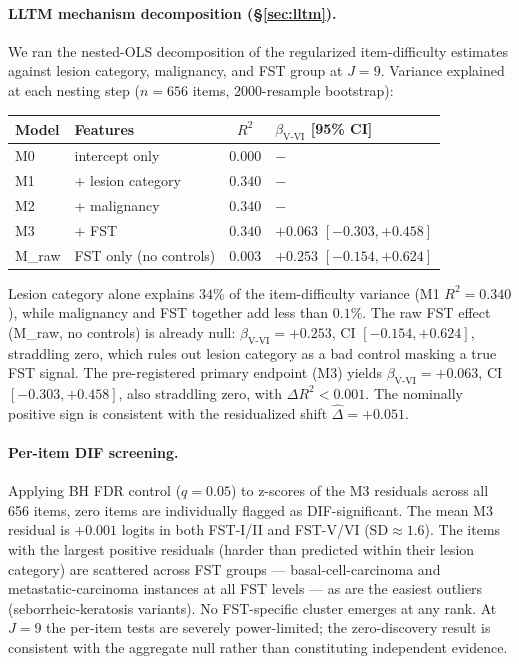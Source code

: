 \documentclass{article}
\begin{document}
\paragraph{LLTM mechanism decomposition (\S\ref{sec:lltm}).}
\label{sec:prelim_lltm}
We ran the nested-OLS decomposition of the regularized item-difficulty estimates against lesion category, malignancy, and FST group at $J = 9$. Variance explained at each nesting step ($n = 656$ items, 2000-resample bootstrap):
\begin{center}
\small
\begin{tabular}{llcl}
\toprule
Model & Features & $R^2$ & $\beta_{\text{V-VI}}$ [95\% CI] \\
\midrule
M0 & intercept only & $0.000$ & $-$ \\
M1 & + lesion category & $0.340$ & $-$ \\
M2 & + malignancy & $0.340$ & $-$ \\
M3 & + FST & $0.340$ & $+0.063$ $[-0.303, +0.458]$ \\
\midrule
M\_raw & FST only (no controls) & $0.003$ & $+0.253$ $[-0.154, +0.624]$ \\
\bottomrule
\end{tabular}
\end{center}
Lesion category alone explains $34\%$ of the item-difficulty variance (M1 $R^2 = 0.340$), while malignancy and FST together add less than $0.1\%$. The raw FST effect (M\_raw, no controls) is already null: $\beta_{\text{V-VI}} = +0.253$, CI $[-0.154, +0.624]$, straddling zero, which rules out lesion category as a bad control masking a true FST signal. The pre-registered primary endpoint (M3) yields $\beta_{\text{V-VI}} = +0.063$, CI $[-0.303, +0.458]$, also straddling zero, with $\Delta R^2 < 0.001$. The nominally positive sign is consistent with the residualized shift $\hat\Delta = +0.051$.

\paragraph{Per-item DIF screening.}
Applying BH FDR control ($q = 0.05$) to z-scores of the M3 residuals across all 656 items, zero items are individually flagged as DIF-significant. The mean M3 residual is $+0.001$ logits in both FST-I/II and FST-V/VI ($\text{SD} \approx 1.6$). The items with the largest positive residuals (harder than predicted within their lesion category) are scattered across FST groups — basal-cell-carcinoma and metastatic-carcinoma instances at all FST levels — as are the easiest outliers (seborrheic-keratosis variants). No FST-specific cluster emerges at any rank. At $J = 9$ the per-item tests are severely power-limited; the zero-discovery result is consistent with the aggregate null rather than constituting independent evidence.
\end{document}

